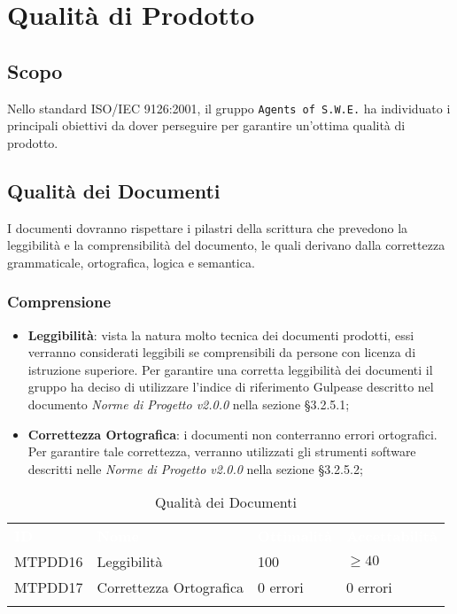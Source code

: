 \section{Qualità di Prodotto}
\label{qualitaProdotto}

\subsection{Scopo}

Nello standard ISO/IEC 9126:2001, il gruppo \texttt{Agents of S.W.E.} ha individuato i principali obiettivi da dover perseguire per garantire un'ottima qualità di prodotto.  

\subsection{Qualità dei Documenti}

I documenti dovranno rispettare i pilastri della scrittura che prevedono la leggibilità e la comprensibilità del documento, le quali derivano dalla correttezza grammaticale, ortografica, logica e semantica.

\subsubsection{Comprensione}

\begin{itemize}
	\item \textbf{Leggibilità}: vista la natura molto tecnica dei documenti prodotti, essi verranno considerati leggibili se comprensibili da persone con licenza di istruzione superiore. Per garantire una corretta leggibilità dei documenti il gruppo ha deciso di utilizzare l'indice di riferimento Gulpease descritto nel documento \textit{Norme di Progetto v2.0.0} nella sezione §3.2.5.1;
	
	\item \textbf{Correttezza Ortografica}: i documenti non conterranno errori ortografici. Per garantire tale correttezza, verranno utilizzati gli strumenti software descritti nelle \textit{Norme di Progetto v2.0.0} nella sezione §3.2.5.2;
	
\end{itemize}

\begin{longtable}{|C{.15\textwidth}|C{.24\textwidth}|C{.24\textwidth}|C{.24\textwidth}|}
\hline
{}\textbf{\textcolor{white}{ID}} & \textbf{\textcolor{white}{Nome}} & \textbf{\textcolor{white}{Ottimalità}} & \textbf{\textcolor{white}{Accettabilità}}\\
MTPDD16 & Leggibilità & 100 & $\geq 40$ \\
\hline
{}MTPDD17 & Correttezza Ortografica & 0 errori & 0 errori \\ 
\hline
\caption{Qualità dei Documenti}
\label{QualitàDocumenti}
\end{longtable}

